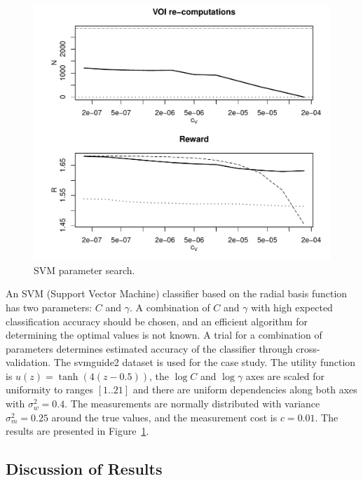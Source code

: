 \begin{figure}[h]
\centering
\includegraphics[scale=0.63]{raticomp-svmguide2.pdf}
\caption{SVM parameter search.}
\label{fig:svmguide2}
\end{figure}
An SVM (Support Vector Machine) classifier based on the radial basis
function has two parameters: $C$ and $\gamma$.  A combination of $C$
and $\gamma$ with high expected classification accuracy should be
chosen, and an efficient algorithm for determining the optimal values
is not known. A trial for a combination of parameters determines
estimated accuracy of the classifier through cross-validation. The
{\sc svmguide2} \cite{Hsu.dataset} dataset is used for the case study.
The utility function is $u(z)=\tanh(4(z-0.5))$, the $\log C$ and $\log
\gamma$ axes are scaled for uniformity to ranges $[1..21]$ and there
are uniform dependencies along both axes with $\sigma_w^2=0.4$. The
measurements are normally distributed with variance $\sigma_m^2=0.25$
around the true values, and the measurement cost is $c=0.01$.
The results are presented in Figure~\ref{fig:svmguide2}.

\subsection{Discussion of Results}

